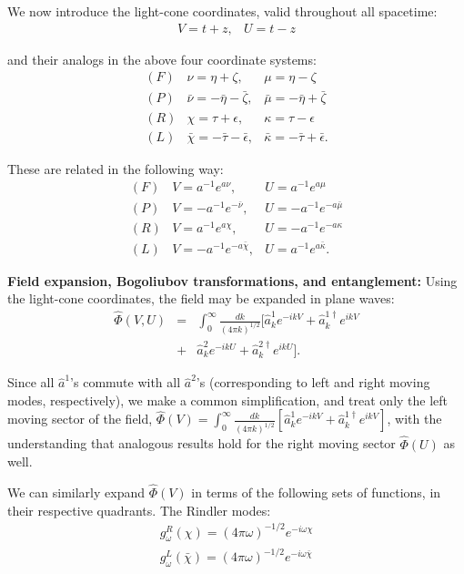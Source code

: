 \documentclass[aps,prl,showpacs,12pt]{revtex4}
\begin{document}
We now introduce the light-cone coordinates, valid throughout all spacetime:
\begin{eqnarray*}
V = t + z, & U = t - z
\end{eqnarray*}

and their analogs in the above four coordinate systems:
\begin{eqnarray*}
(F) & \nu = \eta + \zeta, & \mu = \eta - \zeta \\
(P) & \bar{\nu} = -\bar{\eta} - \bar{\zeta}, & \bar{\mu} = - \bar{\eta} + \bar{\zeta} \\
(R) & \chi = \tau + \epsilon, & \kappa = \tau - \epsilon \\
(L) & \bar{\chi} = - \bar{\tau} - \bar{\epsilon}, & \bar{\kappa} = - \bar{\tau} + \bar{\epsilon}.
\end{eqnarray*}

These are related in the following way:
\begin{eqnarray*}
(F) & V = a^{-1} e^{a \nu}, & U = a^{-1} e^{a \mu} \\
(P) & V = - a^{-1} e^{- \bar{\nu}}, & U = - a^{-1} e^{-a \bar{\mu}} \\
(R) & V = a^{-1} e^{a \chi}, & U = -a^{-1} e^{-a \kappa} \\
(L) & V = - a^{-1} e^{- a \bar{\chi}}, & U = a^{-1} e^{a \bar{\kappa}}.
\end{eqnarray*}

\textbf{Field expansion, Bogoliubov transformations, and entanglement:}  Using the light-cone coordinates, the field may be expanded in plane waves:
\begin{eqnarray*}
\hat{\Phi}(V, U) &=& \int_{0}^{\infty} \frac{dk}{ (4 \pi k)^{1/2}}  [ \hat{a}^{1}_{k} e^{-ikV} + \hat{a}^{1 \dagger}_{k} e^{ikV} \\
 &+& \hat{a}^{2}_{k} e^{-ikU} + \hat{a}^{2 \dagger}_{k} e^{ikU}  ].
\end{eqnarray*}

Since all $\hat{a}^{1}$'s commute with all $\hat{a}^{2}$'s (corresponding to left and right moving modes, respectively), we make a common simplification, and treat only the left moving sector of the field, $\hat{\Phi}(V) = \int_{0}^{\infty} \frac{dk}{ (4 \pi k)^{1/2}}  [ \hat{a}^{1}_{k} e^{-ikV} + \hat{a}^{1 \dagger}_{k} e^{ikV}]$, with the understanding that analogous results hold for the right moving sector $\hat{\Phi}(U)$ as well.

We can similarly expand $\hat{\Phi}(V)$ in terms of the following sets of functions, in their respective quadrants.  The Rindler modes:
\begin{eqnarray*}
g_{\omega}^{R}(\chi) = (4 \pi \omega)^{-1/2} e^{-i \omega  \chi} \\
g_{\omega}^{L}(\bar{\chi}) = (4 \pi \omega)^{-1/2} e^{-i \omega \bar{\chi}}
\end{eqnarray*}
\end{document}

